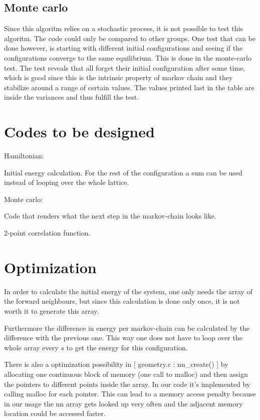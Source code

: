 \documentclass[11pt,a4paper]{article}
\begin{document}
\subsection{Monte carlo}

Since this algoritm relies on a stochastic process, it is not possible to test this algoritm. The code could only be compared to other groups. One test that can be done however, is starting with different initial configurations and seeing if the configurations converge to the same equilibrium. This is done in the monte-carlo test. The test reveals that all forget their initial configuration after some time, which is good since this is the intrinsic property of markov chain and they stabilize around a range of certain values. The values printed last in the table are inside the variances and thus fulfill the test.

\section{Codes to be designed}

Hamiltonian:

Initial energy calculation. For the rest of the configuration a sum can be used instead of looping over the whole lattice.

Monte carlo:

Code that renders what the next step in the markov-chain looks like.

2-point correlation function.

\section{Optimization}

In order to calculate the initial energy of the system, one only needs the array of the forward neighbours, but since this calculation is done only once, it is not worth it to generate this array.

Furthermore the difference in energy per markov-chain can be calculated by the difference with the previous one. This way one does not have to loop over the whole array every $s$ to get the energy for this configuration.

There is also a optimization possibility in [ geometry.c : nn\_create() ] by allocating one continuous block of memory (one call to malloc) and then assign the pointers to different points inside the array. In our code it's implemented by calling malloc for each pointer. This can lead to a memory access penalty because in our usage the nn array gets looked up very often and the adjacent memory location could be accessed faster.
\end{document}
